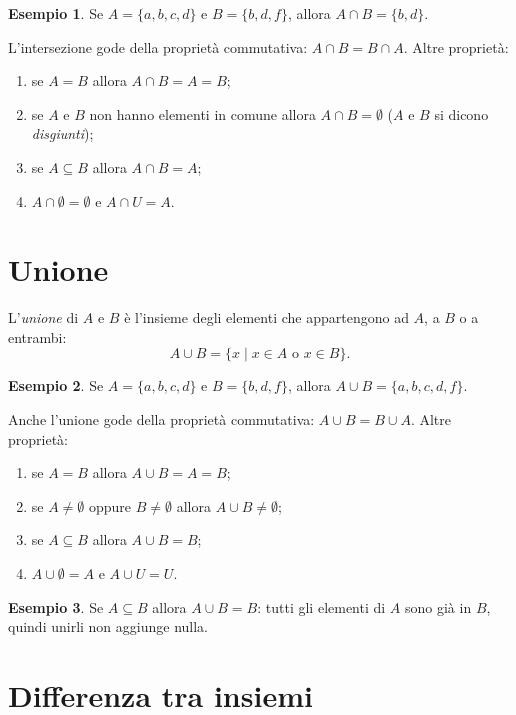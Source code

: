 \documentclass[11pt,a4paper]{article}
\theoremstyle{definition}
\newtheorem*{esempio}{Esempio}
\begin{document}
\begin{esempio}
Se $A = \{a, b, c, d\}$ e $B = \{b, d, f\}$, allora $A \cap B = \{b, d\}$.
\end{esempio}

L'intersezione gode della proprietà commutativa: $A \cap B = B \cap A$.
Altre proprietà:
\begin{enumerate}
    \item se $A = B$ allora $A \cap B = A = B$;
    \item se $A$ e $B$ non hanno elementi in comune allora $A \cap B = \emptyset$ ($A$ e $B$ si dicono \emph{disgiunti});
    \item se $A \subseteq B$ allora $A \cap B = A$;
    \item $A \cap \emptyset = \emptyset$ e $A \cap U = A$.
\end{enumerate}
\newpage
\section{Unione}

\begin{definizione}
L'\emph{unione} di $A$ e $B$ è l'insieme degli elementi che appartengono
ad $A$, a $B$ o a entrambi:
\[
A \cup B = \{x \mid x \in A \text{ o } x \in B\}.
\]
\end{definizione}

\begin{esempio}
Se $A = \{a, b, c, d\}$ e $B = \{b, d, f\}$, allora
$A \cup B = \{a, b, c, d, f\}$.
\end{esempio}

Anche l'unione gode della proprietà commutativa: $A \cup B = B \cup A$.
Altre proprietà:
\begin{enumerate}
    \item se $A = B$ allora $A \cup B = A = B$;
    \item se $A \neq \emptyset$ oppure $B \neq \emptyset$ allora $A \cup B \neq \emptyset$;
    \item se $A \subseteq B$ allora $A \cup B = B$;
    \item $A \cup \emptyset = A$ e $A \cup U = U$.
\end{enumerate}

\begin{esempio}
Se $A \subseteq B$ allora $A \cup B = B$: tutti gli elementi di $A$ sono già in $B$, quindi unirli non aggiunge nulla.
\end{esempio}

\section{Differenza tra insiemi}
\end{document}
